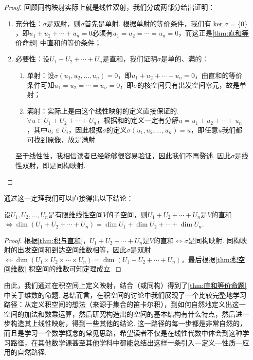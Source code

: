\begin{proof}
    回顾同构映射实际上就是线性双射，我们分成两部分给出证明：
    \begin{enumerate}
        \item 充分性：$\sigma$是双射，则$\sigma$首先是单射. 根据单射的等价条件，我们有$\ker \sigma=\{0\}$，即$u_1+u_2+\cdots+u_n=0$必须有$u_1=u_2=\cdots=u_n=0$，而这正是\autoref{thm:直和等价命题} 中直和的等价条件；

        \item 必要性：设$U_1+U_2+\cdots+U_n$是直和，我们证明$\sigma$是单的、满的：
              \begin{enumerate}
                  \item 单射：设$\sigma(u_1,u_2,\ldots,u_n)=0$，即$u_1+u_2+\cdots+u_n=0$，由直和的等价条件可知$u_1=u_2=\cdots=u_n=0$，即$\sigma$的核空间只有出发空间零元，故是单射；

                  \item 满射：实际上是由这个线性映射的定义直接保证的. $\forall u \in U_1+U_2+\cdots+U_n$，根据和的定义一定有分解$u=u_1+u_2+\cdots+u_n$，其中$u_i \in U_i$，因此根据$\sigma$的定义$\sigma(u_1,u_2,\ldots,u_n)=u$，即任意$u$我们都可找到原像，故是满射.
              \end{enumerate}
              至于线性性，我相信读者已经能够很容易验证，因此我们不再赘述. 因此$\sigma$是线性双射，即是同构映射.
    \end{enumerate}
\end{proof}

通过这一定理我们可以直接得出以下结论：
\begin{theorem}{}{}
    设$U_1,U_2,\ldots,U_n$是有限维线性空间$V$的子空间，则$U_1+U_2+\cdots+U_n$是$V$的直和$\iff \dim(U_1+U_2+\cdots+U_n)=\dim U_1+\dim U_2+\cdots+\dim U_n$.
\end{theorem}

\begin{proof}
    根据\autoref{thm:积与直和}，$U_1+U_2+\cdots+U_n$是$V$的直和$\iff \sigma$是同构映射. 同构映射的出发空间和到达空间维数相等，因此$\sigma$是双射$\iff \dim(U_1 \times U_2 \times \cdots \times U_n)=\dim(U_1+U_2+\cdots+U_n)$，最后根据\autoref{thm:积空间维数} 积空间的维数可知定理成立.
\end{proof}

由此，我们通过在积空间上定义映射，结合（或同构）得到了\autoref{thm:直和等价命题} 中关于维数的命题. 总结而言，在积空间的讨论中我们展现了一个比较完整地学习路径：从定义积空间的想法（来源于集合的笛卡尔积），到如何自然地定义出这一空间的加法和数乘运算，然后研究构造出的空间的基本结构有什么特点，然后进一步构造其上线性映射，得到一些其他的结论. 这一路径的每一步都是非常自然的，而且是学习一个数学概念的常见思路，希望读者不仅是在线性代数中体会到这种学习路径，在其他数学课甚至其他学科中都能总结出这样一条引入—定义—性质—应用的自然路径.


